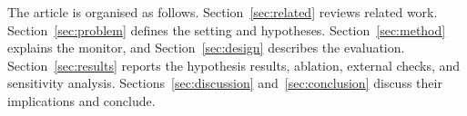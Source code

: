 The article is organised as follows. Section~\ref{sec:related} reviews related work. Section~\ref{sec:problem} defines the setting and hypotheses. Section~\ref{sec:method} explains the monitor, and Section~\ref{sec:design} describes the evaluation. Section~\ref{sec:results} reports the hypothesis results, ablation, external checks, and sensitivity analysis. Sections~\ref{sec:discussion} and~\ref{sec:conclusion} discuss their implications and conclude.
